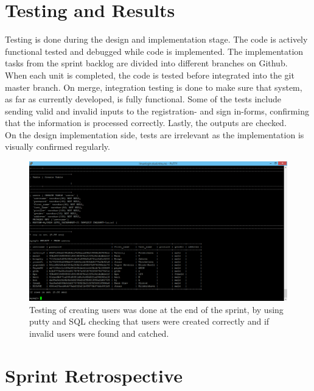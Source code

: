 \section{Testing and Results}
Testing is done during the design and implementation stage. The code is actively functional tested and debugged while code is implemented. The implementation tasks from the sprint backlog are divided into different branches on Github. When each unit is completed, the code is tested before integrated into the git master branch. On merge, integration testing is done to make sure that system, as far as currently developed, is fully functional. Some of the tests include sending valid and invalid inputs to the registration- and sign in-forms, confirming that the information is processed correctly. Lastly, the outputs are checked. \\
On the design implementation side, tests are irrelevant as the implementation is visually confirmed regularly. 


\begin{figure}[ht!]
\centering
\includegraphics[width={\linewidth}]{Sprint2/img/Sprint2-testing.png}
\caption{ Testing of creating users was done at the end of the sprint, by using putty and SQL checking that users were created correctly and if invalid users were found and catched. \label{overflow}}
\end{figure}

\section{Sprint Retrospective} 

